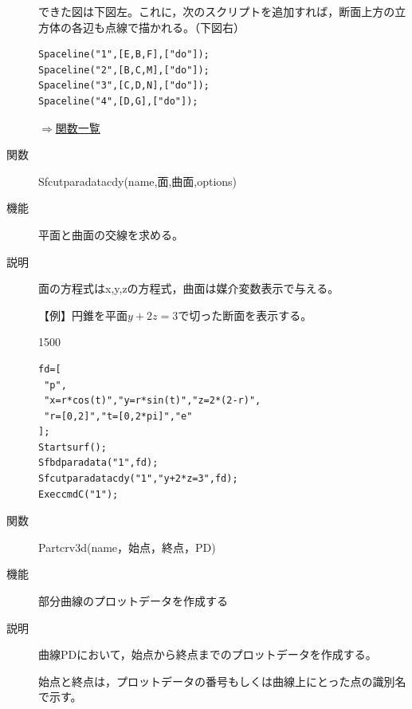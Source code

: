 \documentclass[papersize,a4paper,12pt,uplatex]{jsarticle}
\begin{document}
\begin{description}
できた図は下図左。これに，次のスクリプトを追加すれば，断面上方の立方体の各辺も点線で描かれる。（下図右）
\begin{verbatim}
Spaceline("1",[E,B,F],["do"]);
Spaceline("2",[B,C,M],["do"]);
Spaceline("3",[C,D,N],["do"]);
Spaceline("4",[D,G],["do"]);
\end{verbatim}
\begin{center}  \end{center}

\begin{flushright} \hyperlink{functionlist}{$\Rightarrow$関数一覧}\end{flushright}

\vspace{\baselineskip}
\hypertarget{sfcutparadatacdy}{}
\item[関数]Sfcutparadatacdy(name,面,曲面,options)
\item[機能]平面と曲面の交線を求める。
\item[説明]面の方程式はx,y,zの方程式，曲面は媒介変数表示で与える。

\vspace{\baselineskip}
【例】円錐を平面$y+2z=3$で切った断面を表示する。

\begin{layer}{150}{0}
\end{layer}
\begin{verbatim}
fd=[
 "p",
 "x=r*cos(t)","y=r*sin(t)","z=2*(2-r)",
 "r=[0,2]","t=[0,2*pi]","e"
];
Startsurf(); 
Sfbdparadata("1",fd);
Sfcutparadatacdy("1","y+2*z=3",fd);
ExeccmdC("1");
\end{verbatim}


\vspace{\baselineskip}
\hypertarget{partcrv3d}{}
\item[関数]Partcrv3d(name，始点，終点，PD)
\item[機能]部分曲線のプロットデータを作成する
\item[説明]曲線PDにおいて，始点から終点までのプロットデータを作成する。

始点と終点は，プロットデータの番号もしくは曲線上にとった点の識別名で示す。


\end{description}
\end{document}
